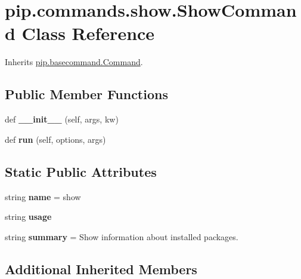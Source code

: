 \hypertarget{classpip_1_1commands_1_1show_1_1_show_command}{}\section{pip.\+commands.\+show.\+Show\+Command Class Reference}
\label{classpip_1_1commands_1_1show_1_1_show_command}


Inherits \hyperlink{classpip_1_1basecommand_1_1_command}{pip.\+basecommand.\+Command}.

\subsection*{Public Member Functions}
\begin{DoxyCompactItemize}
\item 
\mbox{\label{classpip_1_1commands_1_1show_1_1_show_command_acf662ac77bb7b97aed39f4f3437b6c1b}} 
def {\bfseries \+\_\+\+\_\+init\+\_\+\+\_\+} (self, args, kw)
\item 
\mbox{\label{classpip_1_1commands_1_1show_1_1_show_command_a0919d0f70312dd27fe313bbf0c70773b}} 
def {\bfseries run} (self, options, args)
\end{DoxyCompactItemize}
\subsection*{Static Public Attributes}
\begin{DoxyCompactItemize}
\item 
\mbox{\label{classpip_1_1commands_1_1show_1_1_show_command_a4078d97e7465e98ec1664fdc42f733d0}} 
string {\bfseries name} = \textquotesingle{}show\textquotesingle{}
\item 
string {\bfseries usage}
\item 
\mbox{\label{classpip_1_1commands_1_1show_1_1_show_command_adae98b03b52dfaba06785fbce373291c}} 
string {\bfseries summary} = \textquotesingle{}Show information about installed packages.\textquotesingle{}
\end{DoxyCompactItemize}
\subsection*{Additional Inherited Members}


